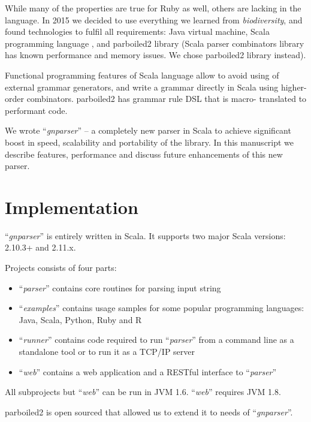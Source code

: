 \documentclass{bmcart}
\begin{document}
While many of the properties are true for Ruby as well, others are lacking in
the language. In 2015 we decided to use everything we learned from
\textit{biodiversity}, and found technologies to fulfil all requirements: Java
virtual machine, Scala programming language \cite{odersky2004overview}, and
parboiled2 library \cite{parboiled2} (Scala parser combinators
\cite{moors2008parser} library has known performance and memory issues. We
chose parboiled2 library instead).

Functional programming features of Scala language allow to avoid using of
external grammar generators, and write a grammar directly in Scala using
higher-order combinators. parboiled2 has grammar rule DSL that is macro-
translated \cite{Burmako:2013:SML:2489837.2489840} to performant code.

We wrote ``\textit{gnparser}'' -- a completely new parser in Scala to achieve
significant boost in speed, scalability and portability of the library. In
this manuscript we describe features, performance and discuss future
enhancements of this new parser.

\section*{Implementation}

``\textit{gnparser}'' is entirely written in Scala. It supports two major
Scala versions: 2.10.3+ and 2.11.x.

Projects consists of four parts:

\begin{itemize}
  \item ``\textit{parser}'' contains core routines for parsing input string
  \item ``\textit{examples}'' contains usage samples for some popular
  programming languages: Java, Scala, Python, Ruby and R
  \item ``\textit{runner}'' contains code required to run ``\textit{parser}''
  from a command line as a standalone tool or to run it as a TCP/IP server
  \item ``\textit{web}'' contains a web application and a RESTful interface to
  ``\textit{parser}''
\end{itemize}

All subprojects but ``\textit{web}'' can be run in JVM 1.6. ``\textit{web}''
requires JVM 1.8.

parboiled2 is open sourced that allowed us to extend it to needs of
``\textit{gnparser}''.
\end{document}
